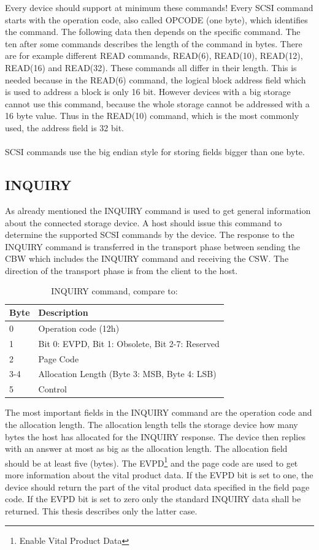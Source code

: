 Every device should support at minimum these commands! Every SCSI command starts with the operation code, also called OPCODE (one byte), which identifies the command. The following data then depends on the specific command. The ten after some commands describes the length of the command in bytes. There are for example different READ commands, READ(6), READ(10), READ(12), READ(16) and READ(32)\cite{scsi_seagate}. These commands all differ in their length. This is needed because in the READ(6) command, the logical block address field which is used to address a block is only 16 bit. However devices with a big storage cannot use this command, because the whole storage cannot be addressed with a 16 byte value. Thus in the READ(10) command, which is the most commonly used, the address field is 32 bit.\\\\
SCSI commands use the big endian style for storing fields bigger than one byte.

\subsection{INQUIRY}

As already mentioned the INQUIRY command is used to get general information about the connected storage device. A host should issue this command to determine the supported SCSI commands by the device. The response to the INQUIRY command is transferred in the transport phase between sending the CBW which includes the INQUIRY command and receiving the CSW. The direction of the transport phase is from the client to the host.

\begin{table}[ht]
\caption{INQUIRY command, compare to: \cite{scsi_seagate}}
\centering
\begin{tabular}{|l|l|}
\hline\hline
\textbf{Byte} & \textbf{Description}\\ \hline
0 & Operation code (12h) \\ \hline
1 & Bit 0: EVPD, Bit 1: Obsolete, Bit 2-7: Reserved\\ \hline
2 & Page Code \\ \hline
3-4 & Allocation Length (Byte 3: MSB, Byte 4: LSB) \\ \hline
5 & Control \\ \hline
\end{tabular}
\label{table:inquiry}
\end{table}

The most important fields in the INQUIRY command are the operation code and the allocation length. The allocation length tells the storage device how many bytes the host has allocated for the INQUIRY response. The device then replies with an answer at most as big as the allocation length. The allocation field should be at least five (bytes). The EVPD\footnote{Enable Vital Product Data} and the page code are used to get more information about the vital product data. If the EVPD bit is set to one, the device should return the part of the vital product data specified in the field page code. If the EVPD bit is set to zero only the standard INQUIRY data shall be returned\cite{scsi_seagate}. This thesis describes only the latter case.

